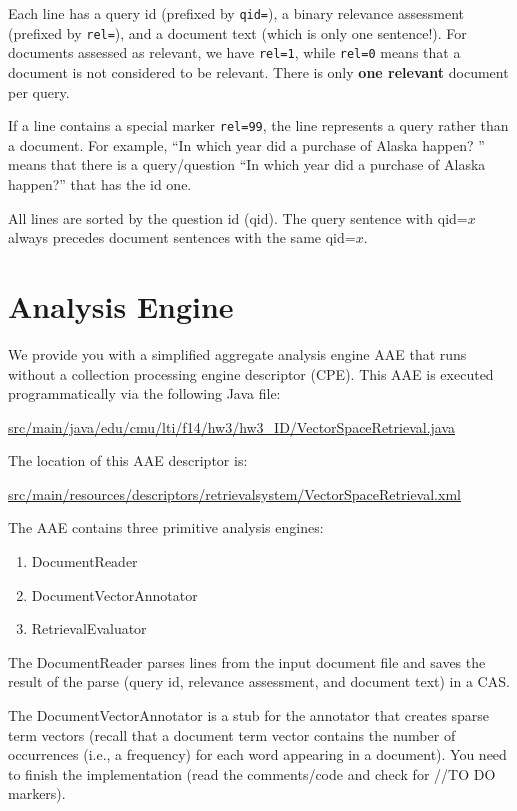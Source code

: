 \documentclass[oneside,11pt]{memoir}
\begin{document}
Each line has a query id (prefixed by \texttt{qid=}), 
a binary relevance assessment (prefixed by \texttt{rel=}), 
and a document text (which is only one sentence!). 
For documents assessed as relevant, we have \texttt{rel=1},
while \texttt{rel=0} means that a document is not considered to be relevant.
There is only \textbf{one relevant} document per query.

If a line contains a special marker \texttt{rel=99},
the line represents a query rather than a document.
For example, ``In which year did a purchase of Alaska happen?
'' means that there is a query/question ``In which year did a purchase of Alaska happen?'' 
that has the id one.

All lines are sorted by the question id (qid).
The query sentence with qid=$x$ always precedes
document sentences with the same qid=$x$.

\section{Analysis Engine}
\label{SectionAe}
We provide you with a simplified aggregate analysis engine AAE that runs without 
a collection processing engine descriptor (CPE).
This AAE is executed programmatically via the following Java file:

\begin{center}\url{src/main/java/edu/cmu/lti/f14/hw3/hw3_ID/VectorSpaceRetrieval.java} \end{center}

The location of this AAE descriptor is:

\begin{center}\url{src/main/resources/descriptors/retrievalsystem/VectorSpaceRetrieval.xml} \end{center}

The AAE contains three primitive analysis engines:
\begin{enumerate}
\item DocumentReader
\item DocumentVectorAnnotator
\item RetrievalEvaluator
\end{enumerate}

The DocumentReader parses lines from the input document file and saves the result of the parse (query id, relevance assessment, and document text) in a CAS.

The DocumentVectorAnnotator is a stub for the annotator that creates sparse term vectors
(recall that a document term vector contains the number of occurrences (i.e., a frequency)
for each word appearing in a document). 
You need to finish the implementation (read the comments/code and check for //TO DO markers).
\end{document}
